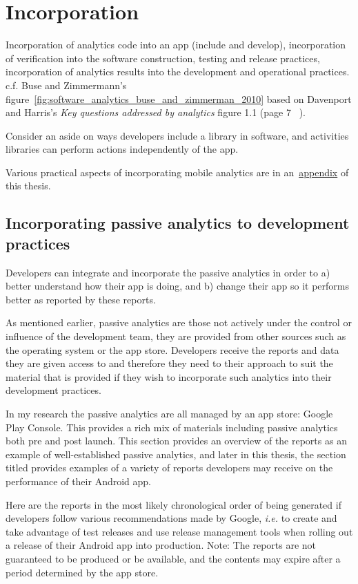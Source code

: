 \section{Incorporation}
Incorporation of analytics code into an app (include and develop), incorporation of verification into the software construction, testing and release practices, incorporation of analytics results into the development and operational practices. c.f. Buse and Zimmermann's figure~\ref{fig:software_analytics_buse_and_zimmerman_2010} based on Davenport and Harris's \emph{Key questions addressed by analytics} figure 1.1 (page 7 ~\cite{davenport2010analytics_at_work}).

Consider an aside on ways developers include a library in software, and activities libraries can perform actions independently of the app. 

Various practical aspects of incorporating mobile analytics are in an~\href{practical-aspects-appendix}{appendix} of this thesis.  


\subsection{Incorporating passive analytics to development practices}
Developers can integrate and incorporate the passive analytics %
in order to a) better understand how their app is doing, and b) change their app so it performs better as reported by these reports.

As mentioned earlier, passive analytics are those not actively under the control or influence of the development team, they are provided from other sources such as the operating system or the app store. Developers receive the reports and data they are given access to and therefore they need to their approach to suit the material that is provided if they wish to incorporate such analytics into their development practices.

In my research the passive analytics are all managed by an app store: Google Play Console. This provides a rich mix of materials including passive analytics both pre and post launch. This section provides an overview of the reports as an example of well-established passive analytics, and later in this thesis, the section titled \href{google_play_console_section}{\emph{}} provides examples of a variety of reports developers may receive on the performance of their Android app.

Here are the reports in the most likely chronological order of being generated if developers follow various recommendations made by Google, \emph{i.e.} to create and take advantage of test releases and use release management tools when rolling out a release of their Android app into production. Note: The reports are not guaranteed to be produced or be available, and the contents may expire after a period determined by the app store.


